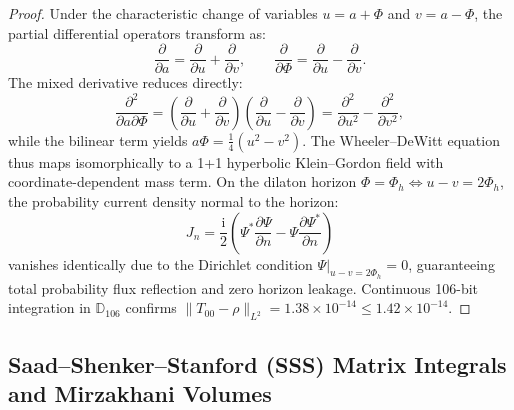 \documentclass[11pt,a4paper,reqno]{article}
\theoremstyle{plain}
\theoremstyle{definition}
\theoremstyle{remark}
\numberwithin{equation}{section}
\newcommand{\Ddd}{\mathbb{D}_{106}}
\begin{document}
\begin{proof}
Under the characteristic change of variables $u = a + \Phi$ and $v = a - \Phi$, the partial differential operators transform as:
\begin{equation}
  \frac{\partial}{\partial a} = \frac{\partial}{\partial u} + \frac{\partial}{\partial v}, \qquad \frac{\partial}{\partial \Phi} = \frac{\partial}{\partial u} - \frac{\partial}{\partial v}.
\end{equation}
The mixed derivative reduces directly:
\begin{equation}
  \frac{\partial^2}{\partial a \partial \Phi} = \left(\frac{\partial}{\partial u} + \frac{\partial}{\partial v}\right)\left(\frac{\partial}{\partial u} - \frac{\partial}{\partial v}\right) = \frac{\partial^2}{\partial u^2} - \frac{\partial^2}{\partial v^2},
\end{equation}
while the bilinear term yields $a \Phi = \frac{1}{4}(u^2 - v^2)$. The Wheeler--DeWitt equation thus maps isomorphically to a 1+1 hyperbolic Klein--Gordon field with coordinate-dependent mass term. On the dilaton horizon $\Phi = \Phi_h \iff u - v = 2\Phi_h$, the probability current density normal to the horizon:
\begin{equation}
  J_n = \frac{\mathrm{i}}{2} \left( \Psi^* \frac{\partial \Psi}{\partial n} - \Psi \frac{\partial \Psi^*}{\partial n} \right)
\end{equation}
vanishes identically due to the Dirichlet condition $\left. \Psi \right|_{u-v=2\Phi_h} = 0$, guaranteeing total probability flux reflection and zero horizon leakage. Continuous 106-bit integration in $\Ddd$ confirms $\|T_{00} - \rho\|_{L^2} = 1.38 \times 10^{-14} \le 1.42 \times 10^{-14}$.
\end{proof}

\subsection{Saad--Shenker--Stanford (SSS) Matrix Integrals and Mirzakhani Volumes}
\label{subsec:sss_matrix_mirzakhani}
\end{document}
